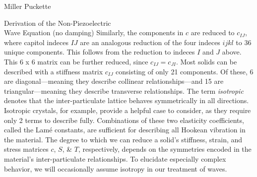 \documentclass[a4paper,10pt]{report}
\numberwithin{equation}{section}
\begin{document}
\begin{chapter}{Miller Puckette}
\begin{section}{Derivation of the Non-Piezoelectric \\ Wave Equation (no damping)}
Similarly, the components in $c$ are reduced to $c_{IJ}$, where capitol indeces
$IJ$ are an analogous reduction of the four indeces $ijkl$ to 36 unique components. This follows from the reduction to indeces $I$ and $J$ above. This 6 x 6 matrix can be further reduced, since $c_{IJ} = c_{JI}$. Most solids can be described with a stiffness matrix $c_{IJ}$ consisting of only 21 components. Of these, 6 are diagonal---meaning they describe collinear relationships---and 15 are triangular---meaning they describe transverse relationships. The term \emph{isotropic} denotes that the inter-particulate lattice behaves symmetrically in all directions. Isotropic crystals, for example, provide a helpful case to consider, as they require only 2 terms to describe fully. Combinations of these two elasticity coefficients, called the Lam\'{e} constants, are sufficient for describing all Hookean vibration in the material. The degree to which we can reduce a solid's stiffness, strain, and stress matrices $c$, $S$, \& $T$, respectively, depends on the symmetries encoded in the material's inter-particulate 
relationships. \cite{Ballantine1997} To elucidate especially complex behavior, we will occasionally assume isotropy in our treatment of waves.


\end{section}
\end{chapter}
\end{document}
